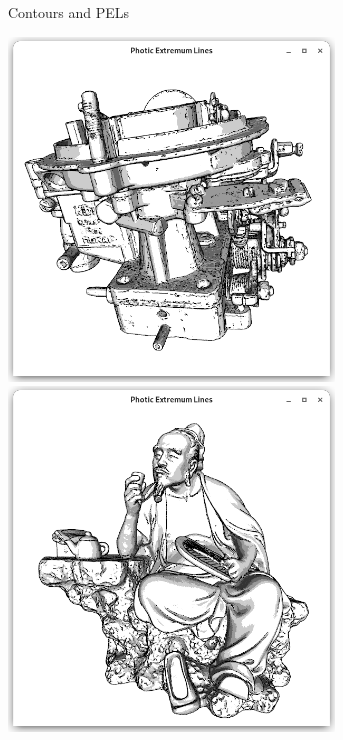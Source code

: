 \documentclass[9pt,fleqn,twoside,twocolumn]{stdglobal}
\begin{document}
\begin{figure}
\begin{subfigure}[t]{0.19\textwidth}
        \caption{Contours and PELs}
      \end{subfigure}%
      \hfill
      \begin{subfigure}[t]{0.19\textwidth}
        \centering
        \includegraphics[width=0.95\textwidth,trim={15px 15 15 50},clip]{images/results/carburetor-contours-pel-toon.png}
        \includegraphics[width=0.95\textwidth,trim={15px 15 15 50},clip]{images/results/luyu-contours-pel-toon.png}

\end{subfigure}
\end{figure}
\end{document}

